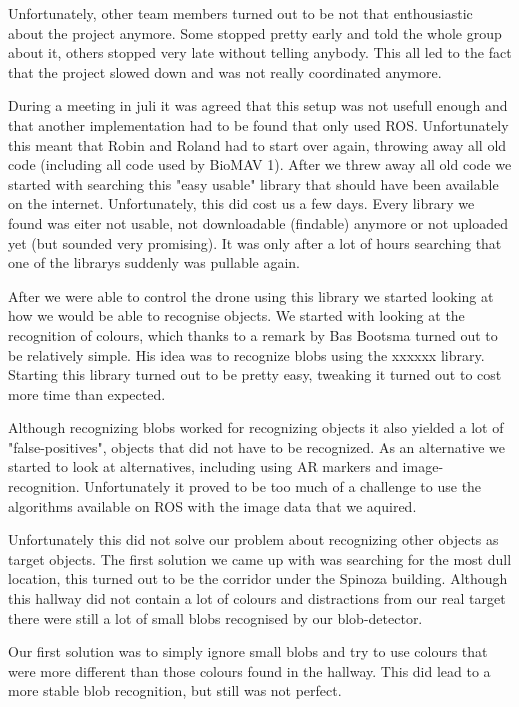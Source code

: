 \documentclass[a4paper,10pt]{article}
\begin{document}
Unfortunately, other team members turned out to be not that enthousiastic about the project anymore. 
Some stopped pretty early and told the whole group about it, others stopped very late without telling anybody.
This all led to the fact that the project slowed down and was not really coordinated anymore. 

During a meeting in juli it was agreed that this setup was not usefull enough and that another implementation had to be found that only used ROS. 
Unfortunately this meant that Robin and Roland had to start over again, throwing away all old code (including all code used by BioMAV 1).  
After we threw away all old code we started with searching this "easy usable" library that should have been available on the internet. 
Unfortunately, this did cost us a few days. 
Every library we found was eiter not usable, not downloadable (findable) anymore or not uploaded yet (but sounded very promising). 
It was only after a lot of hours searching that one of the librarys suddenly was pullable again. 

After we were able to control the drone using this library we started looking at how we would be able to recognise objects. 
We started with looking at the recognition of colours, which thanks to a remark by Bas Bootsma turned out to be relatively simple. 
His idea was to recognize blobs using the xxxxxx library. 
Starting this library turned out to be pretty easy, tweaking it turned out to cost more time than expected. 

Although recognizing blobs worked for recognizing objects it also yielded a lot of "false-positives", objects that did not have to be recognized.
As an alternative we started to look at alternatives, including using AR markers and image-recognition. 
Unfortunately it proved to be too much of a challenge to use the algorithms available on ROS with the image data that we aquired. 

Unfortunately this did not solve our problem about recognizing other objects as target objects. 
The first solution we came up with was searching for the most dull location, this turned out to be the corridor under the Spinoza building. 
Although this hallway did not contain a lot of colours and distractions from our real target there were still a lot of small blobs recognised by our blob-detector. 

Our first solution was to simply ignore small blobs and try to use colours that were more different than those colours found in the hallway. 
This did lead to a more stable blob recognition, but still was not perfect. 
\end{document}

